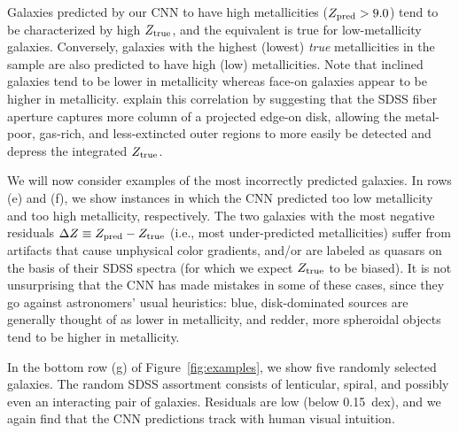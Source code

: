 \documentclass[fleqn,usenatbib]{mnras}
\newcommand{\ie}{i.e.}
\begin{document}
Galaxies predicted by our CNN to have high metallicities ($Z_{\rm pred} > 9.0$) tend to be characterized by high $Z_{\rm true}$, and the equivalent is true for low-metallicity galaxies. Conversely, galaxies with the highest (lowest) \textit{true} metallicities in the sample are also predicted to have high (low) metallicities. Note that inclined galaxies tend to be lower in metallicity whereas face-on galaxies appear to be higher in metallicity. \cite{Tremonti2004} explain this correlation by suggesting that the SDSS fiber aperture captures more column of a projected edge-on disk, allowing the metal-poor, gas-rich, and less-extincted outer regions to more easily be detected and depress the integrated $Z_{\rm true}$.

We will now consider examples of the most incorrectly predicted galaxies. In rows (e) and (f), we show instances in which the CNN predicted too low metallicity and too high metallicity, respectively. The two galaxies with the most negative residuals $\Delta Z \equiv Z_{\rm pred} - Z_{\rm true}$ (\ie, most under-predicted metallicities) suffer from artifacts that cause unphysical color gradients, and/or are labeled as quasars on the basis of their SDSS spectra (for which we expect $Z_{\rm true}$ to be biased). It is not unsurprising that the CNN has made mistakes in some of these cases, since they go against astronomers' usual heuristics: blue, disk-dominated sources are generally thought of as lower in metallicity, and redder, more spheroidal objects tend to be higher in metallicity.

In the bottom row (g) of Figure~\ref{fig:examples}, we show five randomly selected galaxies. The random SDSS assortment consists of lenticular, spiral, and possibly even an interacting pair of galaxies. Residuals are low (below 0.15~dex), and we again find that the CNN predictions track with human visual intuition.
\end{document}

